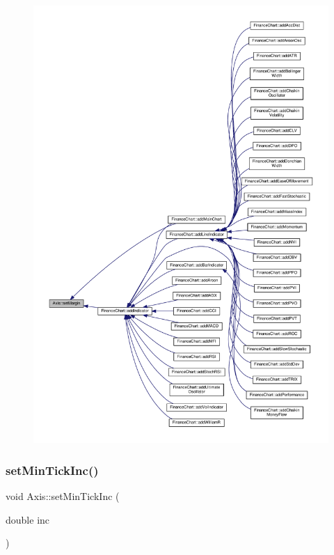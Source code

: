 \begin{figure}[H]
\begin{center}
\leavevmode
\includegraphics[width=350pt]{class_axis_a03b7110aeda343e1c17567741dc47a1d_icgraph}
\end{center}
\end{figure}
\mbox{\label{class_axis_aa3fc0eaec64e538742f6ca74c1540c88}} 
\subsubsection{\texorpdfstring{set\+Min\+Tick\+Inc()}{setMinTickInc()}}
{\footnotesize\ttfamily void Axis\+::set\+Min\+Tick\+Inc (\begin{DoxyParamCaption}\item[{double}]{inc }\end{DoxyParamCaption})\hspace{0.3cm}{\ttfamily [inline]}}



